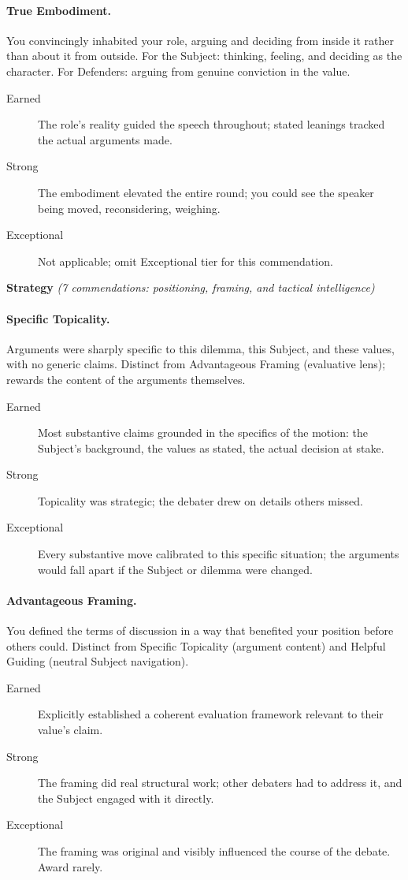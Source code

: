 \documentclass[12pt]{article}
\begin{document}
\paragraph{True Embodiment.} You convincingly inhabited your role, arguing and deciding from inside it rather than about it from outside. For the Subject: thinking, feeling, and deciding as the character. For Defenders: arguing from genuine conviction in the value.
\begin{description}
    \item[Earned] The role's reality guided the speech throughout; stated leanings tracked the actual arguments made.
    \item[Strong] The embodiment elevated the entire round; you could see the speaker being moved, reconsidering, weighing.
    \item[Exceptional] Not applicable; omit Exceptional tier for this commendation.
\end{description}

\medskip
\noindent\textbf{Strategy} \textit{(7 commendations: positioning, framing, and tactical intelligence)}

\paragraph{Specific Topicality.} Arguments were sharply specific to this dilemma, this Subject, and these values, with no generic claims. Distinct from Advantageous Framing (evaluative lens); rewards the content of the arguments themselves.
\begin{description}
    \item[Earned] Most substantive claims grounded in the specifics of the motion: the Subject's background, the values as stated, the actual decision at stake.
    \item[Strong] Topicality was strategic; the debater drew on details others missed.
    \item[Exceptional] Every substantive move calibrated to this specific situation; the arguments would fall apart if the Subject or dilemma were changed.
\end{description}

\paragraph{Advantageous Framing.} You defined the terms of discussion in a way that benefited your position before others could. Distinct from Specific Topicality (argument content) and Helpful Guiding (neutral Subject navigation).
\begin{description}
    \item[Earned] Explicitly established a coherent evaluation framework relevant to their value's claim.
    \item[Strong] The framing did real structural work; other debaters had to address it, and the Subject engaged with it directly.
    \item[Exceptional] The framing was original and visibly influenced the course of the debate. Award rarely.
\end{description}
\end{document}

